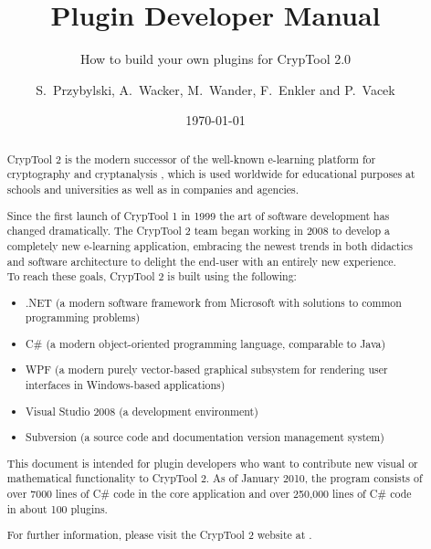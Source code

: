 \documentclass[11pt, a4paper, titlepage]{scrreprt}
\title{Plugin Developer Manual}
\subtitle{How to build your own plugins for CrypTool 2.0}
\author{S.\ Przybylski, A.\ Wacker, M.\ Wander, F.\ Enkler and P.\ Vacek}
\date{\today}
\makeatletter
\newcommand\WaterMarkPic{%
    \setlength{\@tempdimb}{1.85cm}%
    \setlength{\@tempdimc}{2.7cm}%
    \setlength{\unitlength}{1pt}%
    \put(\strip@pt\@tempdimb,\strip@pt\@tempdimc){
            \texttt{[image: figures/ct\_logo\_watermark]}%
    }
}
\makeatother
\begin{document}
	\maketitle

	\begin{abstract}
CrypTool 2 is the modern successor of the well-known e-learning platform for cryptography and cryptanalysis , which is used worldwide for educational purposes at schools and universities as well as in companies and agencies.

Since the first launch of CrypTool 1 in 1999 the art of software development has changed dramatically. The CrypTool 2 team began working in 2008 to develop a completely new e-learning application, embracing the newest trends in both didactics and software architecture to delight the end-user with an entirely new experience.\\

To reach these goals, CrypTool 2 is built using the following:

\begin{itemize}
	\item .NET (a modern software framework from Microsoft with solutions to common programming problems)
	\item C\# (a modern object-oriented programming language, comparable to Java)
    \item WPF (a modern purely vector-based graphical subsystem for rendering user interfaces in Windows-based applications)
    \item Visual Studio 2008 (a development environment)
	\item Subversion (a source code and documentation version management system)
\end{itemize}

This document is intended for plugin developers who want to contribute new visual or mathematical functionality to CrypTool 2. As of January 2010, the program consists of over 7000 lines of C\# code in the core application and over 250,000 lines of C\# code in about 100 plugins.

For further information, please visit the CrypTool 2 website at  .
    \end{abstract}

	\tableofcontents
    \listoffigures


	
	
\end{document}
